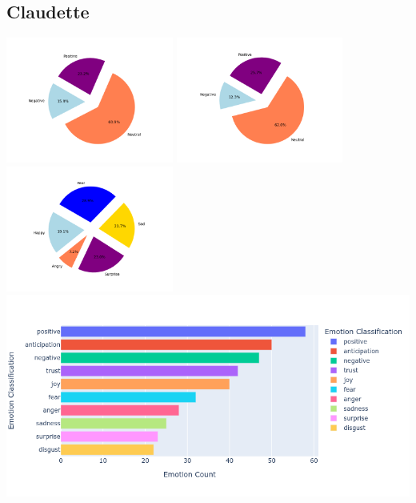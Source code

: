 \documentclass[a4paper,12pt]{article}
\begin{document}
	\subsection{Claudette}
	\begin{center}
		{\includegraphics[width=5.5cm]{claudettesVaderEmotionalPie.png}}
		{\includegraphics[width=5.5cm]{claudettesBlobEmotionalPie.png}}
		{\includegraphics[width=5.5cm]{claudettesEmotionalPie.png}}\\
		{\includegraphics[width=16cm]{claudetteNrcImage.png}}\\
	\end{center}
	\clearpage
\end{document}
